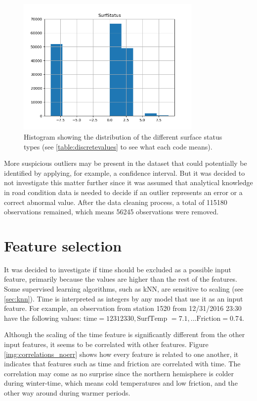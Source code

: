 \begin{figure}[H] 
	\centering
	\includegraphics[width=0.8\textwidth]{media/HistogramSurfaceStatus.png}
	\caption{Histogram showing the distribution of the different surface status types (see \ref{table:discretevalues} to see what each code means).}
	\label{img:histogram_surfstatus}
\end{figure}

	More suspicious outliers may be present in the dataset that could potentially be identified by applying, for example, a confidence interval. But it was decided to not investigate this matter further since it was assumed that analytical knowledge in road condition data is needed to decide if an outlier represents an error or a correct abnormal value. After the data cleaning process, a total of 115180 observations remained, which means 56245 observations were removed.


\section{Feature selection}
	It was decided to investigate if time should be excluded as a possible input feature, primarily because the values are higher than the rest of the features. Some supervised learning algorithms, such as kNN, are sensitive to scaling (see \ref{sec:knn}). Time is interpreted as integers by any model that use it as an input feature. For example, an observation from station 1520 from 12/31/2016 23:30 have the following values: $\text{time} = 12312330, \text{SurfTemp }= 7.1, ... \text{Friction} = 0.74$. 

	Although the scaling of the time feature is significantly different from the other input features, it seems to be correlated with other features. Figure \ref{img:correlations_noerr} shows how every feature is related to one another, it indicates that features such as time and friction are correlated with time. The correlation may come as no surprise since the northern hemisphere is colder during winter-time, which means cold temperatures and low friction, and the other way around during warmer periods. 

